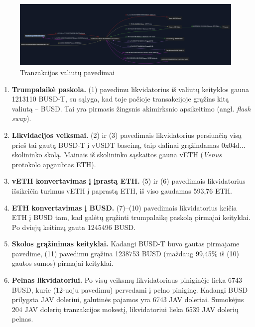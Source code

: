 \documentclass[]{VUMIFTemplateClass}
\begin{document}
\begin{figure}[H]
  \centering
  \includegraphics[scale=0.3]{img/liquidation_example.png}
  \caption{Tranzakcijos valiutų pavedimai \cite{liqpvz}}
  \label{img:liquidation_example}
\end{figure}

\begin{enumerate}
  \item \textbf{Trumpalaikė paskola.}  
  (1) pavedimu likvidatorius iš valiutų keityklos gauna 1213110 BUSD-T, su sąlyga, kad toje pačioje transakcijoje grąžins kitą valiutą – BUSD. Tai yra pirmasis žingsnis akimirksnio apsikeitimo (angl. \textit{flash swap}).

  \item \textbf{Likvidacijos veiksmai.}  
  (2) ir (3) pavedimais likvidatorius persiunčią visą prieš tai gautą BUSD-T į vUSDT baseiną, taip dalinai grąžindamas 0x04d... skolininko skolą. Mainais iš skolininko sąskaitos gauna vETH (\textit{Venus} protokolo apgaubtas ETH).

  \item \textbf{vETH konvertavimas į įprastą ETH.}  
  (5) ir (6) pavedimais likvidatorius išsikeičia turimus vETH į paprastą ETH, iš viso gaudamas 593,76 ETH.

  \item \textbf{ETH konvertavimas į BUSD.}  
  (7)--(10) pavedimais likvidatorius keičia ETH į BUSD tam, kad galėtų grąžinti trumpalaikę paskolą pirmajai keityklai. Po dviejų keitimų gauta 1245496 BUSD.

  \item \textbf{Skolos grąžinimas keityklai.}  
  Kadangi BUSD-T buvo gautas pirmajame pavedime, (11) pavedimu 
  grąžina 1238753 BUSD (maždaug 99,45\% iš (10) gautos sumos) pirmajai keityklai.


  \item \textbf{Pelnas likvidatoriui.}  
Po visų veiksmų likvidatoriaus piniginėje lieka 6743 BUSD, kurie (12-uoju pavedimu) pervedami į pelno piniginę.  
Kadangi BUSD prilygsta JAV doleriui, galutinės pajamos yra 6743 JAV doleriai.  
Sumokėjus 204 JAV dolerių tranzakcijos mokestį, likvidatoriui lieka 6539 JAV dolerių pelnas.
\end{enumerate}
\end{document}
